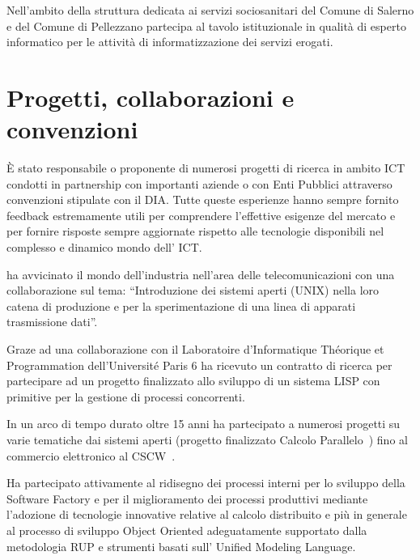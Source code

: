 \documentclass[11pt,a4paper,sans]{moderncv}        %
\begin{document}

{
Nell’ambito della struttura dedicata ai servizi sociosanitari del Comune di Salerno e del Comune di Pellezzano partecipa al tavolo istituzionale in qualità di esperto informatico per le attività di informatizzazione dei servizi erogati.
}

\section{Progetti, collaborazioni e convenzioni}
%

\`E stato responsabile o proponente di numerosi progetti di ricerca in ambito ICT condotti in partnership con importanti aziende o con Enti Pubblici attraverso convenzioni stipulate con il DIA. Tutte queste esperienze hanno sempre fornito feedback estremamente utili per comprendere l'effettive esigenze del mercato e per fornire risposte sempre aggiornate  rispetto alle tecnologie disponibili nel complesso e dinamico mondo dell’ ICT.

\medskip

{
ha avvicinato il mondo dell'industria nell'area delle telecomunicazioni con una collaborazione sul tema: “Introduzione dei sistemi aperti (UNIX) nella loro catena di produzione e per la sperimentazione di una linea di apparati trasmissione dati”.
}

{
Graze ad una collaborazione con il Laboratoire d'Informatique Théorique et Programmation dell'Université Paris 6 ha ricevuto un contratto di ricerca per partecipare ad un progetto finalizzato allo sviluppo di un sistema LISP con primitive per la gestione di processi concorrenti.
}

{
In un arco di tempo durato oltre 15 anni ha partecipato a numerosi progetti su varie tematiche dai sistemi aperti (progetto finalizzato Calcolo Parallelo~\cite{AICA:1,AICA:2}) fino al commercio elettronico al CSCW~\cite{ECOM:2,CABOTO:98,Barra199811}.
}

{
Ha partecipato attivamente al ridisegno dei processi interni per lo sviluppo della Software Factory e per il miglioramento dei processi produttivi mediante l’adozione di tecnologie innovative relative al calcolo distribuito e più in generale al processo di sviluppo Object Oriented adeguatamente supportato dalla metodologia RUP e strumenti basati sull' Unified Modeling Language.
}
\end{document}
